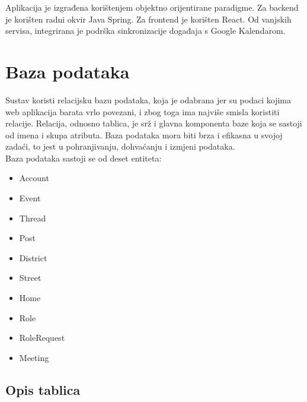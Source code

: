 		Aplikacija je izgrađena korištenjem objektno orijentirane paradigme. Za backend je korišten radni okvir Java Spring. Za frontend je korišten React. Od vanjskih servisa, integrirana je podrška sinkronizacije događaja s Google Kalendarom.
	
		

		

				
		\section{Baza podataka}
						
		
Sustav koristi relacijsku bazu podataka, koja je odabrana jer su podaci kojima web aplikacija barata vrlo povezani, i zbog toga ima najviše smisla koristiti relacije. Relacija, odnosno tablica, je srž i glavna komponenta baze koja se sastoji od imena i skupa atributa. Baza podataka mora biti brza i efikasna u svojoj zadaći, to jest u pohranjivanju, dohvaćanju i izmjeni podataka.\\
Baza podataka sastoji se od deset entiteta:
\begin{multicols}{3}

\begin{itemize}
\item Account
\item Event
\item Thread
\item Post

\end{itemize}

\columnbreak

\begin{itemize}
\item District
\item Street
\item Home
\item Role
\end{itemize}

\begin{itemize}
\item RoleRequest
\item Meeting
\end{itemize}
\end{multicols}
		
			\subsection{Opis tablica}
			

